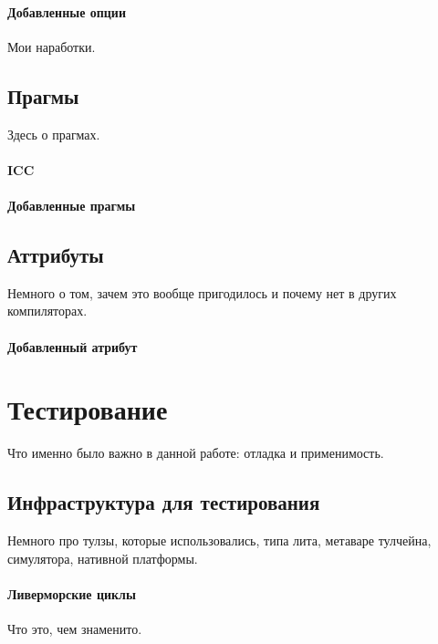 \documentclass[12pt,a4paper]{article}
\begin{document}
\paragraph{Добавленные опции}

Мои наработки.

\subsection{Прагмы}

Здесь о прагмах.

\paragraph{ICC}

\paragraph{Добавленные прагмы}

\subsection{Аттрибуты}

Немного о том, зачем это вообще пригодилось и почему нет в других компиляторах.

\paragraph{Добавленный атрибут}

\section{Тестирование}

Что именно было важно в данной работе: отладка и применимость.

\subsection{Инфраструктура для тестирования}

Немного про тулзы, которые использовались, типа лита, метаваре тулчейна, симулятора, нативной платформы.

\paragraph{Ливерморские циклы}

Что это, чем знаменито.
\end{document}
